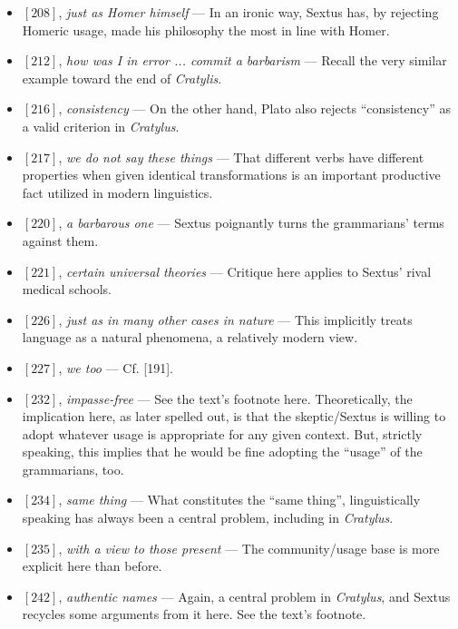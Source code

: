 \documentclass[12pt]{article}
\begin{document}
\begin{itemize}
\item $[208]$, \textit{just as Homer himself} --- In an ironic way, Sextus has, by rejecting Homeric usage, made his philosophy the most in line with Homer.

\item $[212]$, \textit{how was I in error ... commit a barbarism} --- Recall the very similar example toward the end of \textit{Cratylis}.

\item $[216]$, \textit{consistency} --- On the other hand, Plato also rejects ``consistency'' as a valid criterion in \textit{Cratylus}.

\item $[217]$, \textit{we do not say these things} --- That different verbs have different properties when given identical transformations is an important productive fact utilized in modern linguistics.

\item $[220]$, \textit{a barbarous one} --- Sextus poignantly turns the grammarians' terms against them.

\item $[221]$, \textit{certain universal theories} --- Critique here applies to Sextus' rival medical schools.

\item $[226]$, \textit{just as in many other cases in nature} --- This implicitly treats language as a natural phenomena, a relatively modern view.

\item $[227]$, \textit{we too} --- Cf. [191].

\item $[232]$, \textit{impasse-free} --- See the text's footnote here. Theoretically, the implication here, as later spelled out, is that the skeptic/Sextus is willing to adopt whatever usage is appropriate for any given context. But, strictly speaking, this implies that he would be fine adopting the ``usage'' of the grammarians, too.

\item $[234]$, \textit{same thing} --- What constitutes the ``same thing'', linguistically speaking has always been a central problem, including in \textit{Cratylus}.

\item $[235]$, \textit{with a view to those present} --- The community/usage base is more explicit here than before.

\item $[242]$, \textit{authentic names} --- Again, a central problem in \textit{Cratylus}, and Sextus recycles some arguments from it here. See the text's footnote.

\end{itemize}
\end{document}
